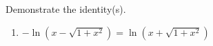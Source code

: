 Demonstrate the identity(s).

\begin{enumerate}[ref={\fcProblemRef}]
\item $-\ln \left(x-\sqrt{1+x^2}\right)= \ln\left(x+\sqrt{1+x^2}\right)$
\end{enumerate}